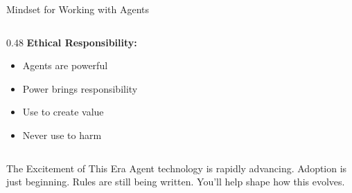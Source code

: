 \documentclass[aspectratio=169,11pt]{beamer}
\begin{document}
\begin{frame}{Mindset for Working with Agents}
\begin{columns}[T]
\begin{column}{0.48\textwidth}
            \vspace{0.3cm}
            \textbf{Ethical Responsibility:}
            \begin{itemize}
                \item Agents are powerful
                \item Power brings responsibility
                \item Use to create value
                \item Never use to harm
            \end{itemize}
        \end{column}
    \end{columns}

    \vspace{0.4cm}
    \begin{block}{The Excitement of This Era}
        Agent technology is rapidly advancing. Adoption is just beginning. Rules are still being written. You'll help shape how this evolves.
    \end{block}
\end{frame}
\end{document}
